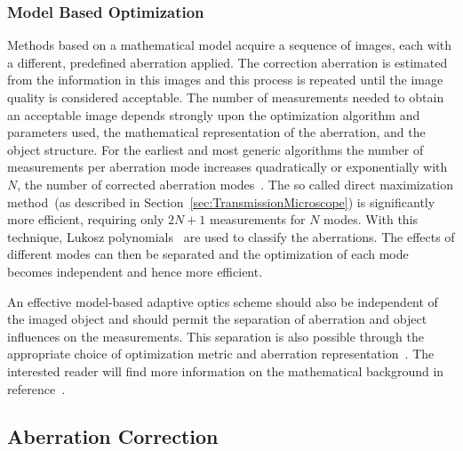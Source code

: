 \subsubsection{Model Based Optimization}
\label{sec:ModelBasedSensing}

Methods based on a mathematical model acquire a sequence of images, each with a different, predefined aberration applied. The correction aberration is estimated from the information in this images and this process is repeated until the image quality is considered acceptable. The number of measurements needed to obtain an acceptable image depends strongly upon the optimization algorithm and parameters used, the mathematical representation of the aberration, and the object structure. For the earliest and most generic algorithms the number of measurements per aberration mode increases quadratically or exponentially with $N$, the number of corrected aberration modes~\cite{wide_sphere_packing}. The so called direct maximization method~(as described in Section~\ref{sec:TransmissionMicroscope}) is significantly more efficient, requiring only $2N+1$ measurements for $N$ modes. With this technique, Lukosz polynomials~\cite{wide_Lukosz_Modes} are used to classify the aberrations. The effects of different modes can then be separated and the optimization of each mode becomes independent and hence more efficient.

An effective model-based adaptive optics scheme should also be independent of the imaged object and should permit the separation of aberration and object influences on the measurements. This separation is also possible through the appropriate choice of optimization metric and aberration representation~\cite{wide_AOM_loew_freq}. The interested reader will find more information on the mathematical background in reference~\cite{wide_AOM_loew_freq, wide_sphere_packing, wide_Lukosz_Modes,wide_parabolic_optimization}. 


\subsection{Aberration Correction}
\label{sec:AberrationCorrection}

